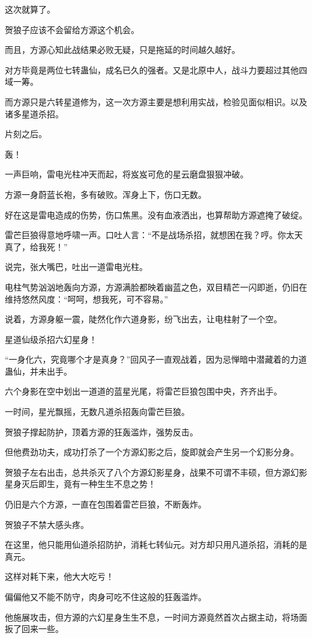 \begin{this_body}
这次就算了。

贺狼子应该不会留给方源这个机会。

而且，方源心知此战结果必败无疑，只是拖延的时间越久越好。

对方毕竟是两位七转蛊仙，成名已久的强者。又是北原中人，战斗力要超过其他四域一筹。

而方源只是六转星道修为，这一次方源主要是想利用实战，检验见面似相识。以及诸多星道杀招。

片刻之后。

轰！

一声巨响，雷电光柱冲天而起，将岌岌可危的星云磨盘狠狠冲破。

方源一身蔚蓝长袍，多有破败。浑身上下，伤口无数。

好在这是雷电造成的伤势，伤口焦黑。没有血液洒出，也算帮助方源遮掩了破绽。

雷芒巨狼得意地呼啸一声。口吐人言：“不是战场杀招，就想困在我？哼。你太天真了，给我死！”

说完，张大嘴巴，吐出一道雷电光柱。

电柱气势汹汹地轰向方源，方源满脸都映着幽蓝之色，双目精芒一闪即逝，仍旧在维持悠然风度：“呵呵，想我死，可不容易。”

说着，方源身躯一震，陡然化作六道身影，纷飞出去，让电柱射了一个空。

星道仙级杀招六幻星身！

“一身化六，究竟哪个才是真身？”回风子一直观战着，因为忌惮暗中潜藏着的力道蛊仙，并未出手。

六个身影在空中划出一道道的蓝星光尾，将雷芒巨狼包围中央，齐齐出手。

一时间，星光飘摇，无数凡道杀招轰向雷芒巨狼。

贺狼子撑起防护，顶着方源的狂轰滥炸，强势反击。

但他费劲功夫，成功打杀了一个方源幻影之后，旋即就会产生另一个幻影分身。

贺狼子左右出击，总共杀灭了八个方源幻影星身，战果不可谓不丰硕，但方源幻影星身灭后即生，竟有一种生生不息之势！

仍旧是六个方源，一直在包围着雷芒巨狼，不断轰炸。

贺狼子不禁大感头疼。

在这里，他只能用仙道杀招防护，消耗七转仙元。对方却只用凡道杀招，消耗的是真元。

这样对耗下来，他大大吃亏！

偏偏他又不能不防守，肉身可吃不住这般的狂轰滥炸。

他施展攻击，但方源的六幻星身生生不息，一时间方源竟然首次占据主动，将场面扳了回来一些。


\end{this_body}
